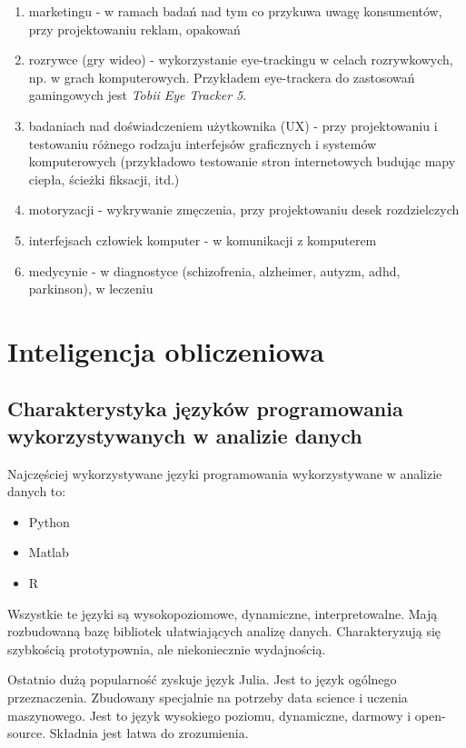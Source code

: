 \documentclass[wi]{zut}
\begin{document}
\begin{enumerate}
    \item marketingu - w ramach badań nad tym co przykuwa uwagę konsumentów, przy projektowaniu reklam, opakowań
    \item rozrywce (gry wideo) - wykorzystanie eye-trackingu w celach rozrywkowych, np. w grach komputerowych. Przykładem eye-trackera do zastosowań gamingowych jest \textit{Tobii Eye Tracker 5}.
    \item badaniach nad doświadczeniem użytkownika (UX) - przy projektowaniu i testowaniu różnego rodzaju interfejsów graficznych i systemów komputerowych (przykładowo testowanie stron internetowych budując mapy ciepła, ścieżki fiksacji, itd.)
    \item motoryzacji - wykrywanie zmęczenia, przy projektowaniu desek rozdzielczych
    \item interfejsach człowiek komputer - w komunikacji z komputerem 
    \item medycynie - w diagnostyce (schizofrenia, alzheimer, autyzm, adhd, parkinson), w leczeniu
\end{enumerate}

\section{Inteligencja obliczeniowa}

\subsection{Charakterystyka języków programowania wykorzystywanych w analizie danych}

Najczęściej wykorzystywane języki programowania wykorzystywane w analizie danych to:

\begin{itemize}
    \item Python
    \item Matlab
    \item R
\end{itemize}

Wszystkie te języki są wysokopoziomowe, dynamiczne, interpretowalne. Mają rozbudowaną bazę bibliotek ułatwiających analizę danych. Charakteryzują się szybkością prototypownia, ale niekoniecznie wydajnością.

Ostatnio dużą popularność zyskuje język Julia. Jest to język ogólnego przeznaczenia. Zbudowany specjalnie na potrzeby data science i uczenia maszynowego. Jest to język wysokiego poziomu, dynamiczne, darmowy i open-source. Składnia jest łatwa do zrozumienia. 
\end{document}

